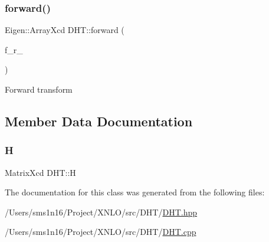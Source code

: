 \subsubsection{\texorpdfstring{forward()}{forward()}}
{\footnotesize\ttfamily Eigen\+::\+Array\+Xcd D\+H\+T\+::forward (\begin{DoxyParamCaption}\item[{Eigen\+::\+Array\+Xcd}]{f\+\_\+r\+\_\+ }\end{DoxyParamCaption})}

Forward transform 

\subsection{Member Data Documentation}
\mbox{\label{class_d_h_t_ac17a580b606f25c937dbdc81dba517d7}} 
\subsubsection{\texorpdfstring{H}{H}}
{\footnotesize\ttfamily Matrix\+Xcd D\+H\+T\+::H}



The documentation for this class was generated from the following files\+:\begin{DoxyCompactItemize}
\item 
/\+Users/sms1n16/\+Project/\+X\+N\+L\+O/src/\+D\+H\+T/\hyperlink{_d_h_t_8hpp}{D\+H\+T.\+hpp}\item 
/\+Users/sms1n16/\+Project/\+X\+N\+L\+O/src/\+D\+H\+T/\hyperlink{_d_h_t_8cpp}{D\+H\+T.\+cpp}\end{DoxyCompactItemize}
